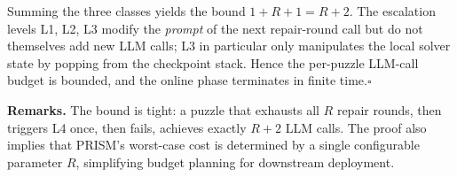 Summing the three classes yields the bound $1 + R + 1 = R + 2$. The escalation levels L1, L2, L3 modify the \emph{prompt} of the next repair-round call but do not themselves add new LLM calls; L3 in particular only manipulates the local solver state by popping from the checkpoint stack. Hence the per-puzzle LLM-call budget is bounded, and the online phase terminates in finite time.\hfill$\square$

\textbf{Remarks.} The bound is tight: a puzzle that exhausts all $R$ repair rounds, then triggers L4 once, then fails, achieves exactly $R + 2$ LLM calls. The proof also implies that PRISM's worst-case cost is determined by a single configurable parameter $R$, simplifying budget planning for downstream deployment.
